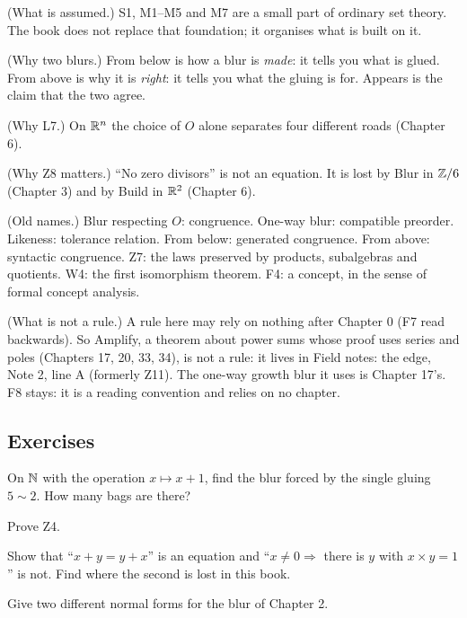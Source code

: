 \begin{lines}
\item[\lab{R1}] (What is assumed.) S1, M1--M5 and M7 are a small part of ordinary set theory. The book does not replace that foundation; it organises what is built on it.
\item[\lab{R2}] (Why two blurs.) From below is how a blur is \emph{made}: it tells you what is glued. From above is why it is \emph{right}: it tells you what the gluing is for. Appears is the claim that the two agree.
\item[\lab{R3}] (Why L7.) On $\mathbb{R}^n$ the choice of $O$ alone separates four different roads (Chapter 6).
\item[\lab{R4}] (Why Z8 matters.) ``No zero divisors'' is not an equation. It is lost by Blur in $\mathbb{Z}/6$ (Chapter 3) and by Build in $\mathbb{R}^2$ (Chapter 6).
\item[\lab{R5}] (Old names.) Blur respecting $O$: congruence. One-way blur: compatible preorder. Likeness: tolerance relation. From below: generated congruence. From above: syntactic congruence. Z7: the laws preserved by products, subalgebras and quotients. W4: the first isomorphism theorem. F4: a concept, in the sense of formal concept analysis.
\item[\lab{R6}] (What is not a rule.) A rule here may rely on nothing after Chapter 0 (F7 read backwards). So Amplify, a theorem about power sums whose proof uses series and poles (Chapters 17, 20, 33, 34), is not a rule: it lives in Field notes: the edge, Note 2, line A (formerly Z11). The one-way growth blur it uses is Chapter 17's. F8 stays: it is a reading convention and relies on no chapter.
\end{lines}

\subsection*{Exercises}

\begin{lines}
\item[\lab{E1}] On $\mathbb{N}$ with the operation $x \mapsto x + 1$, find the blur forced by the single gluing $5 \sim 2$. How many bags are there?
\item[\lab{E2}] Prove Z4.
\item[\lab{E3}] Show that ``$x + y = y + x$'' is an equation and ``$x \neq 0 \Rightarrow$ there is $y$ with $x \times y = 1$'' is not. Find where the second is lost in this book.
\item[\lab{E4}] Give two different normal forms for the blur of Chapter 2.
\end{lines}

